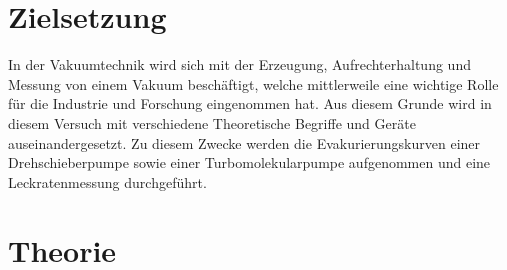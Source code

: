 \section{Zielsetzung}
In der Vakuumtechnik wird sich mit der Erzeugung, Aufrechterhaltung und Messung von einem Vakuum beschäftigt,
welche mittlerweile eine wichtige Rolle für die Industrie und Forschung eingenommen hat. Aus diesem Grunde wird
in diesem Versuch mit verschiedene Theoretische Begriffe und Geräte auseinandergesetzt. Zu diesem Zwecke werden
die Evakurierungskurven einer Drehschieberpumpe sowie einer Turbomolekularpumpe aufgenommen und eine Leckratenmessung 
durchgeführt.

\section{Theorie}
\label{sec:Theorie}

\cite{sample} \cite{cern} \cite{handbuch}
